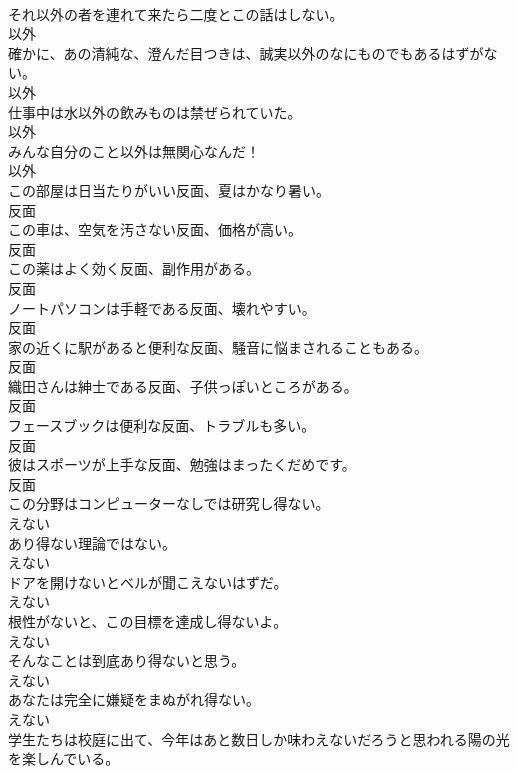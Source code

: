 \documentclass[8pt]{extreport}
\begin{document}
\begin{CJK}{UTF8}{min}
\\	それ以外の者を連れて来たら二度とこの話はしない。	
\\	以外
\\	確かに、あの清純な、澄んだ目つきは、誠実以外のなにものでもあるはずがない。	
\\	以外
\\	仕事中は水以外の飲みものは禁ぜられていた。	
\\	以外
\\	みんな自分のこと以外は無関心なんだ！	
\\	以外
\\	この部屋は日当たりがいい反面、夏はかなり暑い。	
\\	反面
\\	この車は、空気を汚さない反面、価格が高い。	
\\	反面
\\	この薬はよく効く反面、副作用がある。	
\\	反面
\\	ノートパソコンは手軽である反面、壊れやすい。	
\\	反面
\\	家の近くに駅があると便利な反面、騒音に悩まされることもある。	
\\	反面
\\	織田さんは紳士である反面、子供っぽいところがある。	
\\	反面
\\	フェースブックは便利な反面、トラブルも多い。	
\\	反面
\\	彼はスポーツが上手な反面、勉強はまったくだめです。	
\\	反面
\\	この分野はコンピューターなしでは研究し得ない。	
\\	えない
\\	あり得ない理論ではない。	
\\	えない
\\	ドアを開けないとベルが聞こえないはずだ。	
\\	えない
\\	根性がないと、この目標を達成し得ないよ。	
\\	えない
\\	そんなことは到底あり得ないと思う。	
\\	えない
\\	あなたは完全に嫌疑をまぬがれ得ない。	
\\	えない
\\	学生たちは校庭に出て、今年はあと数日しか味わえないだろうと思われる陽の光を楽しんでいる。	

\end{CJK}
\end{document}
